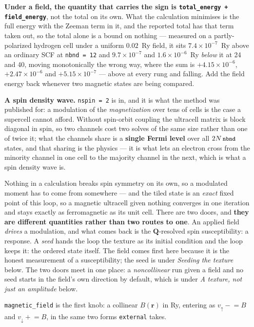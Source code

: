 \documentclass[11pt,a4paper]{article}
\newcommand{\code}[1]{\texttt{\small #1}}
\begin{document}
\textbf{Under a field, the quantity that carries the sign is
\code{total\_energy + field\_energy}}, not the total on its own. What the
calculation minimises is the full energy with the Zeeman term in it, and the
reported total has that term taken out, so the total alone is a bound on
nothing --- measured on a partly-polarized hydrogen cell under a uniform
$0.02$~Ry field, it sits $7.4\times10^{-7}$~Ry above an ordinary SCF at
\code{nbnd = 12} and $9.7\times10^{-7}$ and $1.6\times10^{-6}$~Ry \emph{below}
it at 24 and 40, moving monotonically the wrong way, where the sum is
$+4.15\times10^{-6}$, $+2.47\times10^{-6}$ and $+5.15\times10^{-7}$ --- above at
every rung and falling. Add the field energy back whenever two magnetic states
are being compared.

\textbf{A spin density wave.} \code{nspin = 2} is in, and it is what the method
was published for: a modulation of the \emph{magnetization} over tens of cells
is the case a supercell cannot afford. Without spin-orbit coupling the ultracell
matrix is block diagonal in spin, so two channels cost two solves of the same
size rather than one of twice it; what the channels share is a \textbf{single
Fermi level} over all $2N\,\code{nbnd}$ states, and that sharing is the physics
--- it is what lets an electron cross from the minority channel in one cell to
the majority channel in the next, which is what a spin density wave is.

Nothing in a calculation breaks spin symmetry on its own, so a modulated moment
has to come from somewhere --- and the tiled state is an \emph{exact} fixed
point of this loop, so a magnetic ultracell given nothing converges in one
iteration and stays exactly as ferromagnetic as its unit cell. There are two
doors, and \textbf{they are different quantities rather than two routes to
one}. An applied field \emph{drives} a modulation, and what comes back is the
$\mathbf Q$-resolved spin susceptibility: a response. A \emph{seed} hands the
loop the texture as its initial condition and the loop keeps it: the ordered
state itself. The field comes first here because it is the honest measurement of
a susceptibility; the seed is under \emph{Seeding the texture} below. The two
doors meet in one place: a \emph{noncollinear} run given a field and no seed
starts in the field's own direction by default, which is under \emph{A texture,
not just an amplitude} below.

\code{magnetic\_field} is the first knob: a collinear $B(\mathbf r)$ in Ry,
entering as $v_\uparrow \mathrel{-}= B$ and $v_\downarrow \mathrel{+}= B$, in
the same two forms \code{external} takes.
\end{document}
